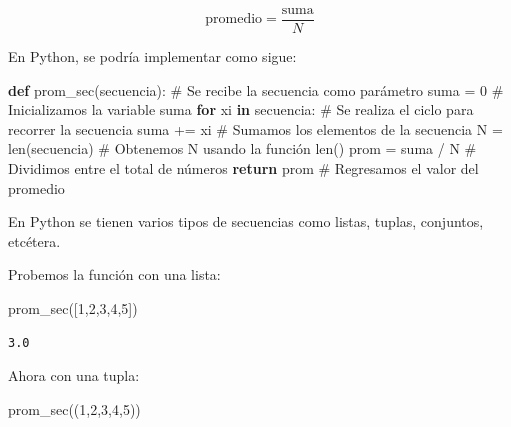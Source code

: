\documentclass[
  spanish,
  letterpaper,
]{scrbook}
\newenvironment{Shaded}{\begin{snugshade}}{\end{snugshade}}
\newcommand{\BuiltInTok}[1]{\textcolor[rgb]{0.00,0.23,0.31}{#1}}
\newcommand{\CommentTok}[1]{\textcolor[rgb]{0.37,0.37,0.37}{#1}}
\newcommand{\ControlFlowTok}[1]{\textcolor[rgb]{0.00,0.23,0.31}{\textbf{#1}}}
\newcommand{\DecValTok}[1]{\textcolor[rgb]{0.68,0.00,0.00}{#1}}
\newcommand{\KeywordTok}[1]{\textcolor[rgb]{0.00,0.23,0.31}{\textbf{#1}}}
\newcommand{\NormalTok}[1]{\textcolor[rgb]{0.00,0.23,0.31}{#1}}
\newcommand{\OperatorTok}[1]{\textcolor[rgb]{0.37,0.37,0.37}{#1}}
\theoremstyle{definition}
\theoremstyle{remark}
\begin{document}
\[
\mbox{promedio} = \frac{\mbox{suma}}{N}
\]

En Python, se podría implementar como sigue:

\begin{Shaded}
\begin{Highlighting}[]
\KeywordTok{def}\NormalTok{ prom\_sec(secuencia):  }\CommentTok{\# Se recibe la \textquotesingle{}secuencia\textquotesingle{} como parámetro}
\NormalTok{    suma }\OperatorTok{=} \DecValTok{0}              \CommentTok{\# Inicializamos la variable \textquotesingle{}suma\textquotesingle{}}
    \ControlFlowTok{for}\NormalTok{ xi }\KeywordTok{in}\NormalTok{ secuencia:  }\CommentTok{\# Se realiza el ciclo para recorrer la \textquotesingle{}secuencia\textquotesingle{}}
\NormalTok{        suma }\OperatorTok{+=}\NormalTok{ xi        }\CommentTok{\# Sumamos los elementos de la secuencia}
\NormalTok{    N }\OperatorTok{=} \BuiltInTok{len}\NormalTok{(secuencia)    }\CommentTok{\# Obtenemos N usando la función len()}
\NormalTok{    prom }\OperatorTok{=}\NormalTok{ suma }\OperatorTok{/}\NormalTok{ N       }\CommentTok{\# Dividimos entre el total de números}
    \ControlFlowTok{return}\NormalTok{ prom           }\CommentTok{\# Regresamos el valor del promedio}
\end{Highlighting}
\end{Shaded}

En Python se tienen varios tipos de secuencias como listas, tuplas,
conjuntos, etcétera.

Probemos la función con una lista:

\begin{Shaded}
\begin{Highlighting}[]
\NormalTok{prom\_sec([}\DecValTok{1}\NormalTok{,}\DecValTok{2}\NormalTok{,}\DecValTok{3}\NormalTok{,}\DecValTok{4}\NormalTok{,}\DecValTok{5}\NormalTok{])}
\end{Highlighting}
\end{Shaded}

\begin{verbatim}
3.0
\end{verbatim}

Ahora con una tupla:

\begin{Shaded}
\begin{Highlighting}[]
\NormalTok{prom\_sec((}\DecValTok{1}\NormalTok{,}\DecValTok{2}\NormalTok{,}\DecValTok{3}\NormalTok{,}\DecValTok{4}\NormalTok{,}\DecValTok{5}\NormalTok{))}
\end{Highlighting}
\end{Shaded}
\end{document}
